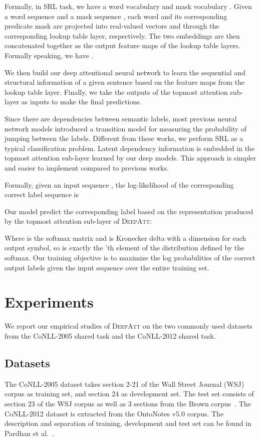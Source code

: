 \documentclass[letterpaper]{article} \usepackage{aaai18}  \usepackage{times}  \usepackage{helvet}  \usepackage{courier}  \usepackage{url}  \usepackage{graphicx}  \frenchspacing  \setlength{\pdfpagewidth}{8.5in}  \setlength{\pdfpageheight}{11in}  \usepackage{latexsym}
\begin{document}
Formally, in SRL task, we have a word vocabulary  and mask vocabulary . Given a word sequence  and a mask sequence , each word  and its corresponding predicate mask  are projected into real-valued vectors  and  through the corresponding lookup table layer, respectively. The two embeddings are then concatenated together as the output feature maps of the lookup table layers. Formally speaking, we have .

We then build our deep attentional neural network to learn the sequential and structural information of a given sentence based on the feature maps from the lookup table layer. Finally, we take the outputs of the topmost attention sub-layer as inputs to make the final predictions.

Since there are dependencies between semantic labels, most previous neural network models introduced a transition model for measuring the probability of jumping between the labels. Different from these works, we perform SRL as a typical classification problem. Latent dependency information is embedded in the topmost attention sub-layer learned by our deep models. This approach is simpler and easier to implement compared to previous works.

Formally, given an input sequence , the log-likelihood of the corresponding correct label sequence  is

Our model predict the corresponding label  based on the representation  produced by the topmost attention sub-layer of \textsc{DeepAtt}:

Where  is the softmax matrix and  is Kronecker delta with a dimension for each output symbol, so  is exactly the 'th element of the distribution defined by the softmax. Our training objective is to maximize the log probabilities of the correct output labels given the input sequence over the entire training set.

\section{Experiments}
We report our empirical studies of \textsc{DeepAtt} on the two commonly used datasets from the CoNLL-2005 shared task and the CoNLL-2012 shared task.

\subsection{Datasets}
The CoNLL-2005 dataset takes section 2-21 of the Wall Street Journal (WSJ) corpus as training set, and section 24 as development set. The test set consists of section 23 of the WSJ corpus as well as 3 sections from the Brown corpus~\cite{Carreras-CoNLL2005}. The CoNLL-2012 dataset is extracted from the OntoNotes v5.0 corpus. The description and separation of training, development and test set can be found in Pardhan et al.~.
\end{document}

